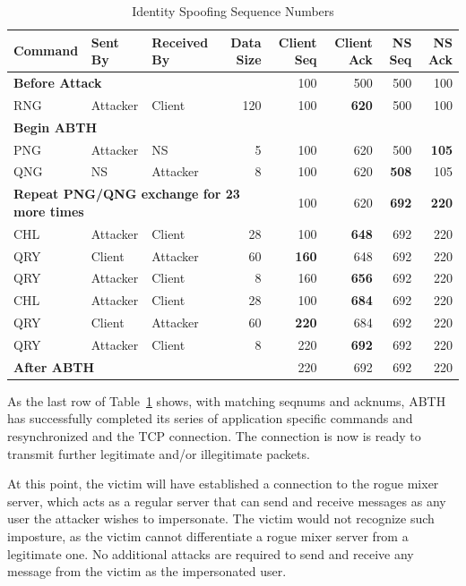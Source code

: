 \documentclass{sig-alternate}
\begin{document}
\begin{table}[tbp]
	\centering

	\caption{Identity Spoofing Sequence Numbers}
	\label{tab:identityspoof}

	\begin{tabular}{l l l r r r r r}
		\hline
		\hline
		\textbf{Command} & \textbf{Sent By} & \textbf{Received By} & \textbf{Data Size} & \textbf{Client Seq} & \textbf{Client Ack} & \textbf{NS Seq} & \textbf{NS Ack} \\
		\hline
		\multicolumn{4}{l}{\textbf{Before Attack}} & 100 & 500 & 500 & 100 \\
		RNG & Attacker & Client & 120 & 100 & \textbf{620} & 500 & 100 \\
		\multicolumn{8}{l}{\textbf{Begin ABTH}} \\
		PNG & Attacker & NS & 5 & 100 & 620 & 500 & \textbf{105} \\
		QNG & NS & Attacker & 8 & 100 & 620 & \textbf{508} & 105 \\
		\multicolumn{4}{l}{\textbf{Repeat PNG/QNG exchange for 23 more times}} & 100 & 620 & \textbf{692} & \textbf{220} \\
		CHL & Attacker & Client & 28 & 100 & \textbf{648} & 692 & 220 \\
		QRY & Client & Attacker & 60 & \textbf{160} & 648 & 692 & 220 \\
		QRY & Attacker & Client & 8 & 160 & \textbf{656} & 692 & 220 \\
		CHL & Attacker & Client & 28 & 100 & \textbf{684} & 692 & 220 \\
		QRY & Client & Attacker & 60 & \textbf{220} & 684 & 692 & 220 \\
		QRY & Attacker & Client & 8 & 220 & \textbf{692} & 692 & 220 \\
		\hline
		\hline
		\multicolumn{4}{l}{\textbf{After ABTH}} & 220 & 692 & 692 & 220 \\
	\end{tabular}
\end{table}

As the last row of Table~\ref{tab:identityspoof} shows, with matching seqnums and acknums, ABTH has successfully completed its series of application specific commands and resynchronized and the TCP connection.
The connection is now is ready to transmit further legitimate and/or illegitimate packets.

At this point, the victim will have established a connection to the rogue mixer server, which acts as a regular server that can send and receive messages as any user the attacker wishes to impersonate.
The victim would not recognize such imposture, as the victim cannot differentiate a rogue mixer server from a legitimate one.
No additional attacks are required to send and receive any message from the victim as the impersonated user.
\end{document}
